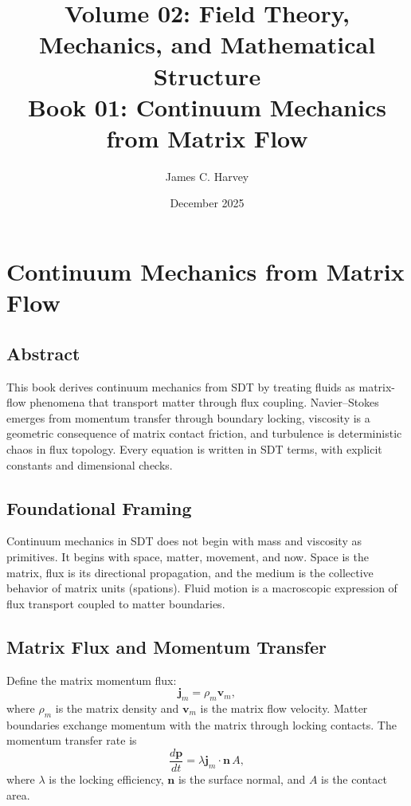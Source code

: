 \documentclass[12pt]{book}
\title{Volume 02: Field Theory, Mechanics, and Mathematical Structure \\ Book 01: Continuum Mechanics from Matrix Flow}
\author{James C. Harvey}
\date{December 2025}
\begin{document}
\maketitle
\tableofcontents

\chapter{Continuum Mechanics from Matrix Flow}

\section*{Abstract}
This book derives continuum mechanics from SDT by treating fluids as matrix-flow phenomena that transport
matter through flux coupling. Navier--Stokes emerges from momentum transfer through boundary locking,
viscosity is a geometric consequence of matrix contact friction, and turbulence is deterministic chaos
in flux topology. Every equation is written in SDT terms, with explicit constants and dimensional checks.

\section{Foundational Framing}
Continuum mechanics in SDT does not begin with mass and viscosity as primitives. It begins with space,
matter, movement, and now. Space is the matrix, flux is its directional propagation, and the medium is
the collective behavior of matrix units (spations). Fluid motion is a macroscopic expression of flux
transport coupled to matter boundaries.

\section{Matrix Flux and Momentum Transfer}
Define the matrix momentum flux:
\begin{equation}
\mathbf{j}_m = \rho_m \mathbf{v}_m,
\end{equation}
where $\rho_m$ is the matrix density and $\mathbf{v}_m$ is the matrix flow velocity. Matter boundaries
exchange momentum with the matrix through locking contacts. The momentum transfer rate is
\begin{equation}
\frac{d\mathbf{p}}{dt} = \lambda \mathbf{j}_m \cdot \mathbf{n}\, A,
\end{equation}
where $\lambda$ is the locking efficiency, $\mathbf{n}$ is the surface normal, and $A$ is the contact
area.
\end{document}
